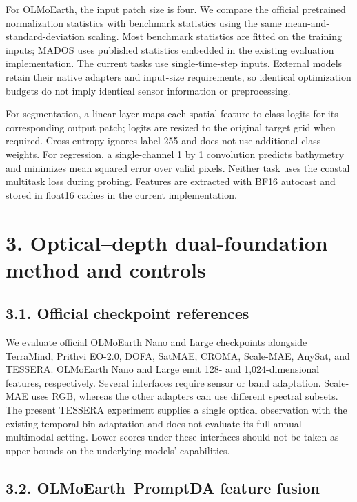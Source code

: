 \documentclass[
  10pt,
  english,
]{article}
\begin{document}
For OLMoEarth, the input patch size is four. We compare the official
pretrained normalization statistics with benchmark statistics using the
same mean-and-standard-deviation scaling. Most benchmark statistics are
fitted on the training inputs; MADOS uses published statistics embedded
in the existing evaluation implementation. The current tasks use
single-time-step inputs. External models retain their native adapters
and input-size requirements, so identical optimization budgets do not
imply identical sensor information or preprocessing.

For segmentation, a linear layer maps each spatial feature to class
logits for its corresponding output patch; logits are resized to the
original target grid when required. Cross-entropy ignores label 255 and
does not use additional class weights. For regression, a single-channel
1 by 1 convolution predicts bathymetry and minimizes mean squared error
over valid pixels. Neither task uses the coastal multitask loss during
probing. Features are extracted with BF16 autocast and stored in float16
caches in the current implementation.

\hypertarget{opticaldepth-dual-foundation-method-and-controls}{%
\section{3. Optical--depth dual-foundation method and
controls}\label{opticaldepth-dual-foundation-method-and-controls}}

\hypertarget{official-checkpoint-references}{%
\subsection{3.1. Official checkpoint
references}\label{official-checkpoint-references}}

We evaluate official OLMoEarth Nano and Large checkpoints alongside
TerraMind, Prithvi EO-2.0, DOFA, SatMAE, CROMA, Scale-MAE, AnySat, and
TESSERA. OLMoEarth Nano and Large emit 128- and 1,024-dimensional
features, respectively. Several interfaces require sensor or band
adaptation. Scale-MAE uses RGB, whereas the other adapters can use
different spectral subsets. The present TESSERA experiment supplies a
single optical observation with the existing temporal-bin adaptation and
does not evaluate its full annual multimodal setting. Lower scores under
these interfaces should not be taken as upper bounds on the underlying
models' capabilities.

\hypertarget{olmoearthpromptda-feature-fusion}{%
\subsection{3.2. OLMoEarth--PromptDA feature
fusion}\label{olmoearthpromptda-feature-fusion}}
\end{document}
